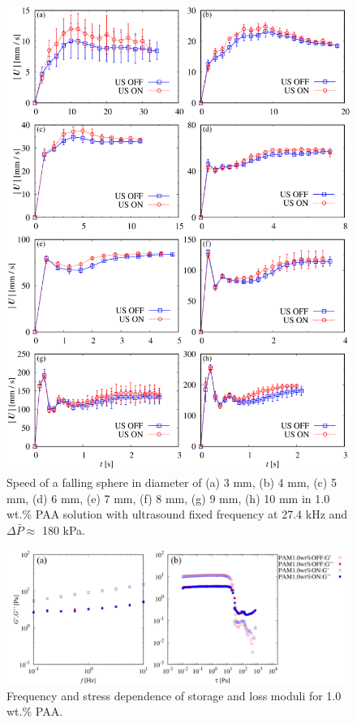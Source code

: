 \begin{figure}[ht]
    \begin{center}
        \includegraphics[width=13cm,clip]{5-Discussion/iwamuro-fall.png}
        \caption{Speed of a falling sphere in diameter of (a) 3 mm, (b) 4 mm, (c) 5 mm, (d) 6 mm, (e) 7 mm, (f) 8 mm, (g) 9 mm, (h) 10 mm in 1.0 wt.\% PAA solution with ultrasound fixed frequency at 27.4 kHz and $\Delta \bar{P} \approx$ 180 kPa\cite{ref:8}.}
        \label{fig:iwamuro-fall}
    \end{center}
\end{figure}

\begin{figure}[ht]
    \includegraphics[width=15cm,clip]{5-Discussion/iwamuro-G.PNG}
    \caption{Frequency and stress dependence of storage and loss moduli for 1.0 wt.\% PAA.\cite{ref:8}}
    \label{fig:iwamuro-G}
\end{figure}

